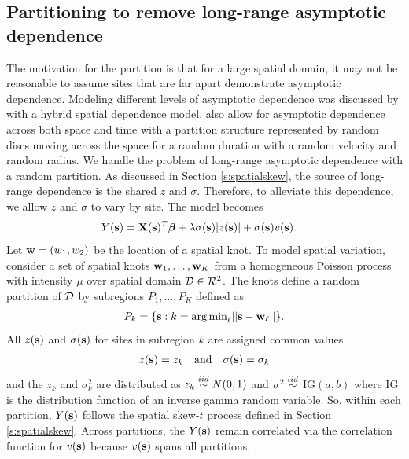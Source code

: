\documentclass[11pt]{article}
\begin{document}
\subsection{Partitioning to remove long-range asymptotic dependence}\label{s:part}
The motivation for the partition is that for a large spatial domain, it may not be reasonable to assume sites that are far apart demonstrate asymptotic dependence.
Modeling different levels of asymptotic dependence was discussed by \citet{Wadsworth2012} with a hybrid spatial dependence model.
\citet{Huser2014} also allow for asymptotic dependence across both space and time with a partition structure represented by random discs moving across the space for a random duration with a random velocity and random radius.
We handle the problem of long-range asymptotic dependence with a random partition.
As discussed in Section \ref{s:spatialskew}, the source of long-range dependence is the shared $z$ and $\sigma$.
Therefore, to alleviate this dependence, we allow $z$ and $\sigma$ to vary by site.
The model becomes
\begin{align} \label{eq:partition}
  Y(\mbox{\bf s}) &= \mbox{\bf X}(\mbox{\bf s})^T \mbox{\boldmath $\beta$} + \lambda \sigma(\mbox{\bf s}) |z(\mbox{\bf s})| + \sigma(\mbox{\bf s}) v(\mbox{\bf s}).
\end{align}
Let $\mbox{\bf w} = (w_1, w_2)$ be the location of a spatial knot.
To model spatial variation, consider a set of spatial knots $\mbox{\bf w}_1, \ldots, \mbox{\bf w}_K$ from a homogeneous Poisson process with intensity $\mu$ over spatial domain ${\cal D} \in {\cal R}^2$.
The knots define a random partition of ${\cal D}$ by subregions $P_{1}, \ldots, P_{K}$ defined as
\begin{align} \label{eq:subregions}
  P_{k} = \{ \mbox{\bf s} : k = {\mathop{\rm arg\, min}}_\ell || \mbox{\bf s} - \mbox{\bf w}_{\ell} || \}.
\end{align}
All $z(\mbox{\bf s})$ and $\sigma(\mbox{\bf s})$ for sites in subregion $k$ are assigned common values
\begin{align}
  z(\mbox{\bf s}) = z_{k} \quad \text{and} \quad \sigma(\mbox{\bf s}) = \sigma_{k} \label{eq:sitezsig}
\end{align}
and the $z_k$ and $\sigma^2_k$ are distributed as $z_k \stackrel{iid}{\sim} N(0, 1)$ and $\sigma^2 \stackrel{iid}{\sim}$ IG$(a, b)$ where IG is the distribution function of an inverse gamma random variable.
So, within each partition, $Y(\mbox{\bf s})$ follows the spatial skew-$t$ process defined in Section \ref{s:spatialskew}.
Across partitions, the $Y(\mbox{\bf s})$ remain correlated via the correlation function for $v(\mbox{\bf s})$ because $v(\mbox{\bf s})$ spans all partitions.
\end{document}
